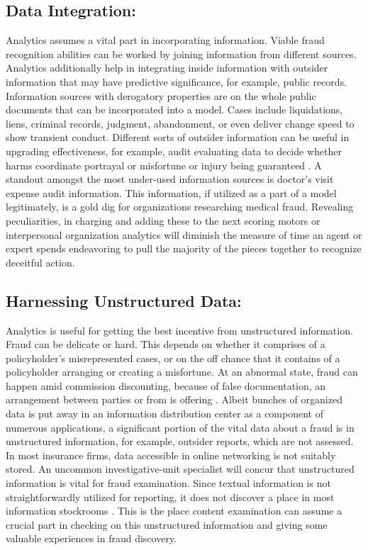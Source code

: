 \documentclass[sigconf]{acmart}
\begin{document}
\subsection{Data Integration:}

Analytics assumes a vital part in incorporating information. Viable fraud recognition abilities can be worked by joining information from different sources. Analytics additionally help in integrating inside information with outsider information that may have predictive significance, for example, public records. Information sources with derogatory properties are on the whole public documents that can be incorporated into a model. Cases include liquidations, liens, criminal records, judgment, abandonment, or even deliver change speed to show transient conduct. Different sorts of outsider information can be useful in upgrading effectiveness, for example, audit evaluating data to decide whether harms coordinate portrayal or misfortune or injury being guaranteed \cite{2}. A standout amongst the most under-used information sources is doctor's visit expense audit information. This information, if utilized as a part of a model legitimately, is a gold dig for organizations researching medical fraud. Revealing peculiarities, in charging and adding these to the next scoring motors or interpersonal organization analytics will diminish the measure of time an agent or expert spends endeavoring to pull the majority of the pieces together to recognize deceitful action. 

\subsection{Harnessing Unstructured Data:}

Analytics is useful for getting the best incentive from unstructured information. Fraud can be delicate or hard. This depends on whether it comprises of a policyholder's misrepresented cases, or on the off chance that it contains of a policyholder arranging or creating a misfortune. At an abnormal state, fraud can happen amid commission discounting, because of false documentation, an arrangement between parties or from is offering \cite{1}. Albeit bunches of organized data is put away in an information distribution center as a component of numerous applications, a significant portion of the vital data about a fraud is in unstructured information, for example, outsider reports, which are not assessed. In most insurance firms, data accessible in online networking is not suitably stored. An uncommon investigative-unit specialist will concur that unstructured information is vital for fraud examination. Since textual information is not straightforwardly utilized for reporting, it does not discover a place in most information stockrooms \cite{3}. This is the place content examination can assume a crucial part in checking on this unstructured information and giving some valuable experiences in fraud discovery.
\end{document}
